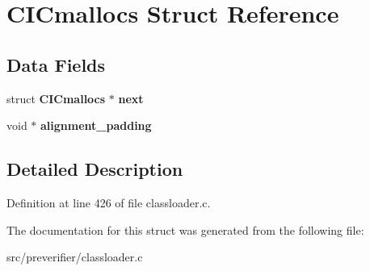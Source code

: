 \section{CICmallocs Struct Reference}
\label{struct_c_i_cmallocs}
\subsection*{Data Fields}
\begin{DoxyCompactItemize}
\item 
struct {\bf CICmallocs} $\ast$ {\bfseries next}\label{struct_c_i_cmallocs_a40507d0b99557f95d9453e469f9d9190}

\item 
void $\ast$ {\bfseries alignment\_\-padding}\label{struct_c_i_cmallocs_acfcc5dd0b09f123979777a13823f079d}

\end{DoxyCompactItemize}


\subsection{Detailed Description}


Definition at line 426 of file classloader.c.



The documentation for this struct was generated from the following file:\begin{DoxyCompactItemize}
\item 
src/preverifier/classloader.c\end{DoxyCompactItemize}
